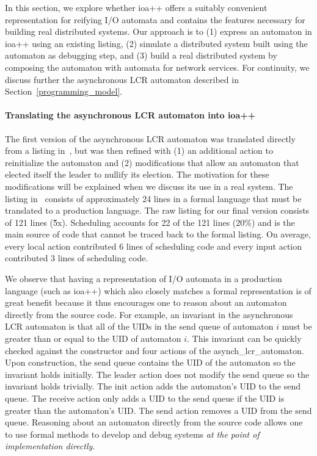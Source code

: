 \ifjournal
In this section, we explore whether ioa++ offers a suitably convenient representation for reifying I/O automata and contains the features necessary for building real distributed systems.
Our approach is to (1) express an automaton in ioa++ using an existing listing, (2) simulate a distributed system built using the automaton as debugging step, and (3) build a real distributed system by composing the automaton with automata for network services.
For continuity, we discuss further the asynchronous LCR automaton described in Section~\ref{programming_model}.

\paragraph*{Translating the asynchronous LCR automaton into ioa++}
The first version of the asynchronous LCR automaton was translated directly from a listing in~\cite{lynch1996distributed}, but was then refined with (1) an additional action to reinitialize the automaton and (2) modifications that allow an automaton that elected itself the leader to nullify its election.
The motivation for these modifications will be explained when we discuss its use in a real system.
The listing in~\cite{lynch1996distributed} consists of approximately 24 lines in a formal language that must be translated to a production language.
The raw listing for our final version consists of 121 lines (\~5x).
Scheduling accounts for 22 of the 121 lines (20\%) and is the main source of code that cannot be traced back to the formal listing.
On average, every local action contributed 6 lines of scheduling code and every input action contributed 3 lines of scheduling code.

We observe that having a representation of I/O automata in a production language (such as ioa++) which also closely matches a formal representation is of great benefit because it thus encourages one to reason about an automaton directly from the source code.
For example, an invariant in the asynchronous LCR automaton is that all of the UIDs in the send queue of automaton $i$ must be greater than or equal to the UID of automaton $i$.
This invariant can be quickly checked against the constructor and four actions of the asynch\_lcr\_automaton.
Upon construction, the send queue contains the UID of the automaton so the invariant holds initially.
The leader action does not modify the send queue so the invariant holds trivially.
The init action adds the automaton's UID to the send queue.
The receive action only adds a UID to the send queue if the UID is greater than the automaton's UID.
The send action removes a UID from the send queue.
Reasoning about an automaton directly from the source code allows one to use formal methods to develop and debug systems \emph{at the point of implementation directly}.

